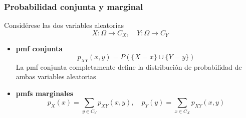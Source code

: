 \documentclass[xcolor=dvipsnames,10pt]{beamer}
\begin{document}
\begin{frame}
  \frametitle{Probabilidad conjunta y marginal}
  Considérese las dos variables aleatorias
  \begin{equation*}
    X \colon \Omega \to C_X, \quad Y \colon \Omega \to C_Y
  \end{equation*}
  \begin{itemize}
  \item \textbf{pmf conjunta}
    \begin{equation*}
      p_{XY}(x, y) = P \left ( \{ X = x \} \cup \{Y = y\} \right )
    \end{equation*}
    \pause%
    La pmf conjunta completamente define la distribución de probabilidad de ambas variables aleatorias
    \pause
  \item \textbf{pmfs marginales}
    \begin{equation*}
      p_X (x) = \sum_{y \in C_Y} p_{XY}(x, y), \quad
      p_Y (y) = \sum_{x \in C_X} p_{XY}(x, y)
    \end{equation*}
  \end{itemize}
\end{frame}
%
\end{document}
